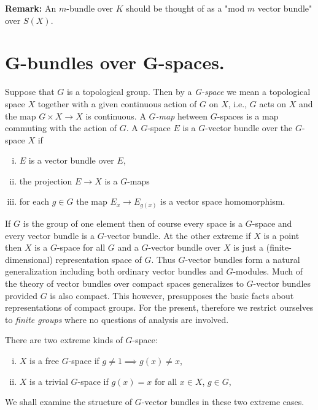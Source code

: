 \textbf{Remark:} An $m$-bundle over $K$ should be thought of as a "mod $m$ vector bundle" over $S(X)$. \newpage 


\section{G-bundles over G-spaces.} Suppose that $G$ is a topological group. Then by a \textit{G-space} we mean a topological space $X$ together with a given continuous action of $G$ on $X$, i.e., $G$ acts on $X$ and the map $G \times X \to X$ is continuous. A \textit{$G$-map} hetween $G$-spaces is a map commuting with the action of $G$. A $G$-space $E$ is a $G$-vector bundle over the $G$-space $X$ if
\begin{enumerate}[(i)]
    \item $E$ is a vector bundle over $E$,
    \item the projection $E \to X$ is a $G$-maps
    \item for each $g \in G$ the map $E_x \to E_{g(x)}$ is a vector space homomorphism.
\end{enumerate}

If $G$ is the group of one element then of course every space is a $G$-space and every vector bundle is a $G$-vector bundle. At the other extreme if $X$ is a point then $X$ is a $G$-space for all $G$ and a $G$-vector bundle over $X$ is just a (finite-dimensional) representation space of $G$. Thus $G$-vector bundles form a natural generalization including both ordinary vector bundles and $G$-modules. Much of the theory of vector bundles over compact spaces generalizes to $G$-vector bundles provided $G$ is also compact. This however, presupposes the basic facts about representations of compact groups. For the present, therefore we restrict ourselves to \textit{finite groups} where no questions of analysis are involved. \par \hfill

There are two extreme kinds of $G$-space:
\begin{enumerate}[(i)]
    \item $X$ is a free $G$-space if $g \neq 1 \implies g(x) \neq x$,
    \item $X$ is a trivial $G$-space if $g(x) = x$ for all $x \in X$, $g \in G$,
\end{enumerate}

We shall examine the structure of $G$-vector bundles in these two extreme cases. \par 

